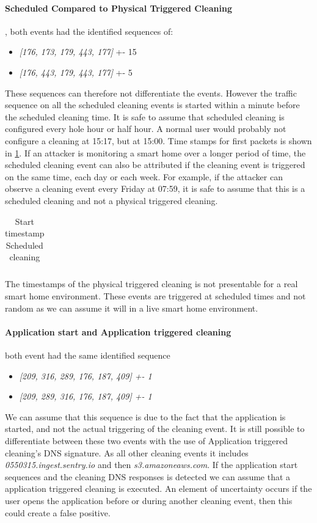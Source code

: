 \paragraph{Scheduled Compared to Physical Triggered Cleaning}, both events had the identified sequences of: 
\begin{itemize}
    \item \textit{[176, 173, 179, 443, 177]} +- 15
    \item \textit{[176, 443, 179, 443, 177]} +- 5
\end{itemize}
These sequences can therefore not differentiate the events. However the traffic sequence on all the scheduled cleaning events is started within a minute before the scheduled cleaning time. It is safe to assume that scheduled cleaning is configured every hole hour or half hour. A normal user would probably not configure a cleaning at 15:17, but at 15:00. Time stamps for first packets is shown in \ref{tab:timestampSCPC}. If an attacker is monitoring a smart home over a longer period of time, the scheduled cleaning event can also be attributed if the cleaning event is triggered on the same time, each day or each week. For example, if the attacker can observe a cleaning event every Friday at 07:59, it is safe to assume that this is a scheduled cleaning and not a physical triggered cleaning.



\begin{table}[H]
\centering
\caption{Start timestamp Scheduled cleaning}
\label{tab:timestampSCPC}
\begin{tabular}{|l|l|l|l|l|l|l|l|l|}
\hline

\end{tabular}
\end{table}

The timestamps of the physical triggered cleaning is not presentable for a real smart home environment. These events are triggered at scheduled times and not random as we can assume it will in a live smart home environment. 

\paragraph{Application start and Application triggered cleaning}
both event had the same identified sequence
\begin{itemize}
    \item \textit{[209, 316, 289, 176, 187, 409] +- 1}
    \item \textit{[209, 289, 316, 176, 187, 409] +- 1}
\end{itemize}
We can assume that this sequence is due to the fact that the application is started, and not the actual triggering of the cleaning event. It is still possible to differentiate between these two events with the use of Application triggered cleaning's DNS signature. As all other cleaning events it includes \textit{0550315.ingest.sentry.io} and then \textit{s3.amazoneaws.com}. If the application start sequences and the cleaning DNS responses is detected we can assume that a application triggered cleaning is executed. An element of uncertainty occurs if the user opens the application before or during another cleaning event, then this could create a false positive. 

